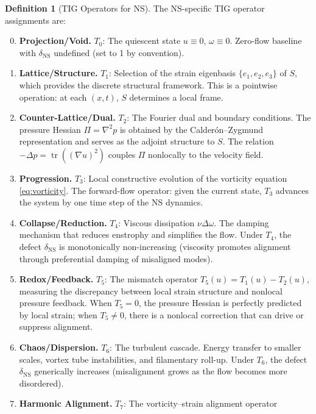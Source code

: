 \documentclass[11pt]{article}
\theoremstyle{definition}
\newtheorem{definition}[theorem]{Definition}
\theoremstyle{remark}
\DeclareMathOperator{\tr}{tr}
\begin{document}
\begin{definition}[TIG Operators for NS]
\label{def:TIG}
The NS-specific TIG operator assignments are:
\begin{enumerate}[nosep,label=\textbf{T\arabic*}:]
  \setcounter{enumi}{-1}
  \item \textbf{Projection/Void.}  $T_0$: The quiescent state $u \equiv 0$,
    $\omega \equiv 0$.  Zero-flow baseline with $\delta_{\mathrm{NS}}$ undefined
    (set to 1 by convention).
  \item \textbf{Lattice/Structure.}  $T_1$: Selection of the strain eigenbasis
    $\{e_1, e_2, e_3\}$ of $S$, which provides the discrete structural framework.
    This is a pointwise operation: at each $(x,t)$, $S$ determines a local frame.
  \item \textbf{Counter-Lattice/Dual.}  $T_2$: The Fourier dual and boundary
    conditions.  The pressure Hessian $\Pi = \nabla^2 p$ is obtained by the
    Calder\'on--Zygmund representation and serves as the adjoint structure to $S$.
    The relation $-\Delta p = \tr((\nabla u)^2)$ couples $\Pi$ nonlocally to the
    velocity field.
  \item \textbf{Progression.}  $T_3$: Local constructive evolution of the vorticity
    equation \eqref{eq:vorticity}.  The forward-flow operator: given the current
    state, $T_3$ advances the system by one time step of the NS dynamics.
  \item \textbf{Collapse/Reduction.}  $T_4$: Viscous dissipation $\nu\Delta\omega$.
    The damping mechanism that reduces enstrophy and simplifies the flow.
    Under $T_4$, the defect $\delta_{\mathrm{NS}}$ is monotonically non-increasing
    (viscosity promotes alignment through preferential damping of misaligned modes).
  \item \textbf{Redox/Feedback.}  $T_5$: The mismatch operator
    $T_5(u) = T_1(u) - T_2(u)$, measuring the discrepancy between local strain
    structure and nonlocal pressure feedback.  When $T_5 = 0$, the pressure
    Hessian is perfectly predicted by local strain; when $T_5 \neq 0$, there is
    a nonlocal correction that can drive or suppress alignment.
  \item \textbf{Chaos/Dispersion.}  $T_6$: The turbulent cascade.  Energy transfer
    to smaller scales, vortex tube instabilities, and filamentary roll-up.  Under
    $T_6$, the defect $\delta_{\mathrm{NS}}$ generically increases (misalignment
    grows as the flow becomes more disordered).
  \item \textbf{Harmonic Alignment.}  $T_7$: The vorticity--strain alignment operator

\end{enumerate}
\end{definition}
\end{document}

